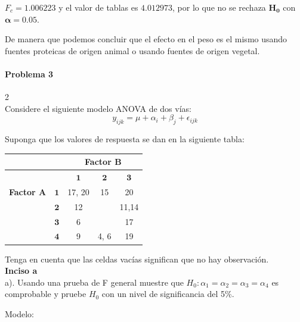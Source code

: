 \documentclass[12pt,a4paper]{report}
\begin{document}
\begin{enumerate}
$F_c = 1.006223$ y el valor de tablas es $4.012973$,  por lo que no se rechaza $\boldsymbol{H_0}$ con $\boldsymbol{\alpha = 0.05}$. 

De manera que podemos concluir que el efecto en el peso es el mismo usando fuentes proteicas de origen animal o usando fuentes de origen vegetal.

\end{enumerate}


\paragraph{Problema 3} 2\\

Considere el siguiente modelo ANOVA de dos vías: $$y_{ijk} = \mu + \alpha_i + \beta_j + \epsilon_{ijk}$$

Suponga que los valores de respuesta se dan en la siguiente tabla:


\begin{table}[h]
    \centering
    \begin{tabular}{cc|c|c|c|}
    \hline
    & & \multicolumn{3}{c|}{\textbf{Factor B}} \\ \hline
    & & $\mathbf{1}$ & $\mathbf{2}$ & $\mathbf{3}$ \\ 
    \hline
    \textbf{Factor A} & $\mathbf{1}$ & 17, 20 & 15 & 20\\ 
    & $\mathbf{2}$ & 12 & & 11,14\\
    & $\mathbf{3}$ & 6 & & 17\\
    & $\mathbf{4}$ & 9 & 4, 6 & 19\\
    \hline
    \end{tabular}
\end{table}


Tenga en cuenta que las celdas vacías significan que no hay observación.\\


\textbf{Inciso a}\\

 a). Usando una prueba de F general muestre que $H_0 : \alpha_1 = \alpha_2 = \alpha_3 = \alpha_4$ es comprobable y pruebe $H_0$ con un nivel de significancia del 5\%.

Modelo:
\end{document}
